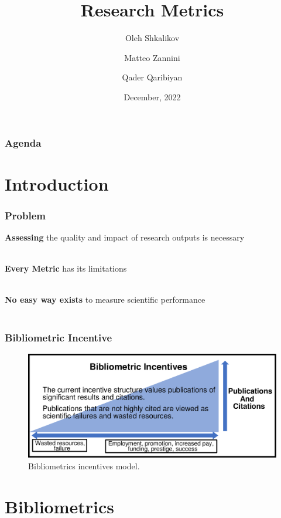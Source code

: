\documentclass{beamer}
\title[Scientific metrics]{Research Metrics}
\author[O. Shkalikov \and M. Zannini \and Q.Qaribiyan]
{Oleh Shkalikov \and Matteo Zannini \and Qader Qaribiyan}
\institute[]{TU Dresden, Computer Science Faculty}
\date{December, 2022}
\begin{document}
\frame{\titlepage}

\begin{frame}
    \frametitle{Agenda}
    \tableofcontents
\end{frame}

\section{Introduction}

\begin{frame}

    \frametitle{Problem}

    \textbf{Assessing} the quality and impact of research outputs is necessary \\~\



     \textbf{Every Metric} has its limitations\\~\



    \textbf{No easy way exists} to measure scientific performance\\~\


\end{frame}

\begin{frame}

    \frametitle{Bibliometric Incentive}

    \begin{figure}[h]
        \includegraphics[height=0.5\textheight]{1.png}
        \caption{Bibliometrics incentives model.}
    \end{figure}

\end{frame}

\section{Bibliometrics}

\end{document}
